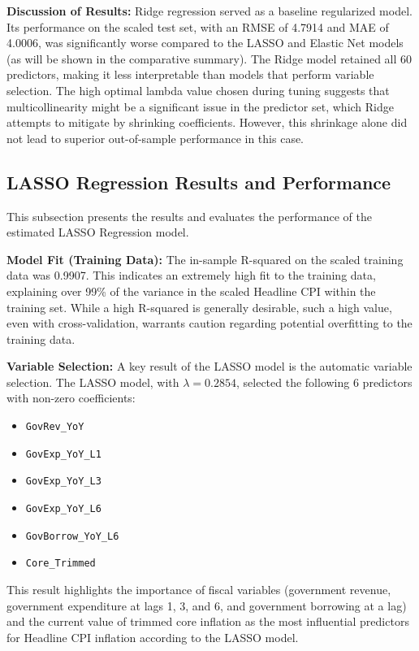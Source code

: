 \documentclass[12pt,a4paper]{article}
\begin{document}
\textbf{Discussion of Results:}
Ridge regression served as a baseline regularized model. Its performance on the scaled test set, with an RMSE of 4.7914 and MAE of 4.0006, was significantly worse compared to the LASSO and Elastic Net models (as will be shown in the comparative summary). The Ridge model retained all 60 predictors, making it less interpretable than models that perform variable selection. The high optimal lambda value chosen during tuning suggests that multicollinearity might be a significant issue in the predictor set, which Ridge attempts to mitigate by shrinking coefficients. However, this shrinkage alone did not lead to superior out-of-sample performance in this case.

\subsection{LASSO Regression Results and Performance}

This subsection presents the results and evaluates the performance of the estimated LASSO Regression model.

\textbf{Model Fit (Training Data):}
The in-sample R-squared on the scaled training data was 0.9907. This indicates an extremely high fit to the training data, explaining over 99\% of the variance in the scaled Headline CPI within the training set. While a high R-squared is generally desirable, such a high value, even with cross-validation, warrants caution regarding potential overfitting to the training data.

\textbf{Variable Selection:}
A key result of the LASSO model is the automatic variable selection. The LASSO model, with $\lambda = 0.2854$, selected the following 6 predictors with non-zero coefficients:
\begin{itemize}
    \item \texttt{GovRev\_YoY}
    \item \texttt{GovExp\_YoY\_L1}
    \item \texttt{GovExp\_YoY\_L3}
    \item \texttt{GovExp\_YoY\_L6}
    \item \texttt{GovBorrow\_YoY\_L6}
    \item \texttt{Core\_Trimmed}
\end{itemize}
This result highlights the importance of fiscal variables (government revenue, government expenditure at lags 1, 3, and 6, and government borrowing at a lag) and the current value of trimmed core inflation as the most influential predictors for Headline CPI inflation according to the LASSO model.
\end{document}
